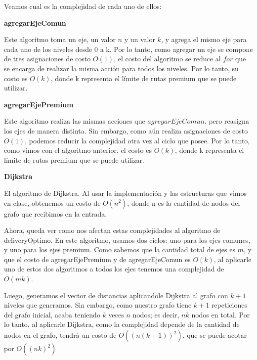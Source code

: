 Veamos cual es la complejidad de cada uno de ellos:

\begin{center}
	\textbf{agregarEjeComun}
\end{center}

Este algoritmo toma un eje, un valor $n$ y un valor $k$, y agrega el mismo eje para cada uno de los niveles desde 0 a k. Por lo tanto, como agregar un eje se compone de tres asignaciones de costo $O(1)$, el costo del algoritmo se reduce al $for$ que se encarga de realizar la misma acción para todos los niveles. Por lo tanto, su costo es $O(k)$, donde k representa el límite de rutas premium que se puede utilizar.

\begin{center}
	\textbf{agregarEjePremium}
\end{center}

Este algoritmo realiza las mismas acciones que $agregarEjeComun$, pero reasigna los ejes de manera distinta. Sin embargo, como aún realiza asignaciones de costo $O(1)$, podemos reducir la complejidad otra vez al ciclo que posee. Por lo tanto, como vimos con el algoritmo anterior, el costo es $O(k)$, donde k representa el límite de rutas premium que se puede utilizar.

\begin{center}
	\textbf{Dijkstra}
\end{center}

El algoritmo de Dijkstra. Al usar la implementación y las estructuras que vimos en clase, obtenemos un costo de $O(n^2)$, donde n es la cantidad de nodos del grafo que recibimos en la entrada.\bigskip

Ahora, queda ver como nos afectan estas complejidades al algoritmo de deliveryOptimo. En este algoritmo, usamos dos ciclos: uno para los ejes comunes, y uno para los ejes premium. Como sabemos que la cantidad total de ejes es $m$, y que el costo de agregarEjePremium y de agregarEjeComun es $O(k)$, al aplicarle uno de estos dos algoritmos a todos los ejes tenemos una complejidad de $O(mk)$.

Luego, generamos el vector de distancias aplicandole Dijkstra al grafo con $k+1$ niveles que generamos. Sin embargo, como nuestro grafo tiene $k+1$ repeticiones del grafo inicial, acaba teniendo $k$ veces $n$ nodos; es decir, $nk$ nodos en total. Por lo tanto, al aplicarle Dijkstra, como la complejidad depende de la cantidad de nodos en el grafo, tendrá un costo de $O((n(k+1))^2)$, que se puede acotar por $O((nk)^2)$

